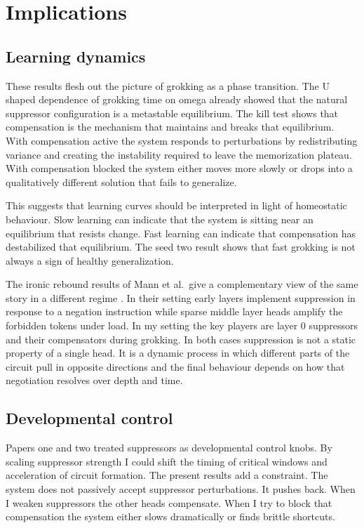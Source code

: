 \section{Implications}

\subsection{Learning dynamics}

These results flesh out the picture of grokking as a phase transition. The U shaped dependence of grokking time on omega already showed that the natural suppressor configuration is a metastable equilibrium. The kill test shows that compensation is the mechanism that maintains and breaks that equilibrium. With compensation active the system responds to perturbations by redistributing variance and creating the instability required to leave the memorization plateau. With compensation blocked the system either moves more slowly or drops into a qualitatively different solution that fails to generalize.

This suggests that learning curves should be interpreted in light of homeostatic behaviour. Slow learning can indicate that the system is sitting near an equilibrium that resists change. Fast learning can indicate that compensation has destabilized that equilibrium. The seed two result shows that fast grokking is not always a sign of healthy generalization.

The ironic rebound results of Mann et al.\ give a complementary view of the same story in a different regime \cite{mann2025dontthink}. In their setting early layers implement suppression in response to a negation instruction while sparse middle layer heads amplify the forbidden tokens under load. In my setting the key players are layer 0 suppressors and their compensators during grokking. In both cases suppression is not a static property of a single head. It is a dynamic process in which different parts of the circuit pull in opposite directions and the final behaviour depends on how that negotiation resolves over depth and time.

\subsection{Developmental control}

Papers one and two treated suppressors as developmental control knobs. By scaling suppressor strength I could shift the timing of critical windows and acceleration of circuit formation. The present results add a constraint. The system does not passively accept suppressor perturbations. It pushes back. When I weaken suppressors the other heads compensate. When I try to block that compensation the system either slows dramatically or finds brittle shortcuts.

